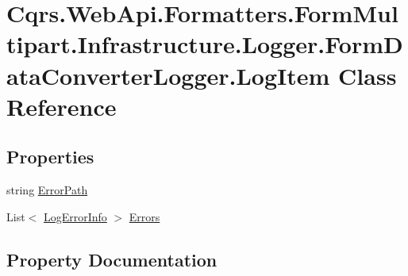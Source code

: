 \hypertarget{classCqrs_1_1WebApi_1_1Formatters_1_1FormMultipart_1_1Infrastructure_1_1Logger_1_1FormDataConverterLogger_1_1LogItem}{}\section{Cqrs.\+Web\+Api.\+Formatters.\+Form\+Multipart.\+Infrastructure.\+Logger.\+Form\+Data\+Converter\+Logger.\+Log\+Item Class Reference}
\label{classCqrs_1_1WebApi_1_1Formatters_1_1FormMultipart_1_1Infrastructure_1_1Logger_1_1FormDataConverterLogger_1_1LogItem}
\subsection*{Properties}
\begin{DoxyCompactItemize}
\item 
string \hyperlink{classCqrs_1_1WebApi_1_1Formatters_1_1FormMultipart_1_1Infrastructure_1_1Logger_1_1FormDataConverterLogger_1_1LogItem_a300199a6b543a7a53b81b18aeb10652b_a300199a6b543a7a53b81b18aeb10652b}{Error\+Path}
\item 
List$<$ \hyperlink{classCqrs_1_1WebApi_1_1Formatters_1_1FormMultipart_1_1Infrastructure_1_1Logger_1_1FormDataConverterLogger_1_1LogErrorInfo}{Log\+Error\+Info} $>$ \hyperlink{classCqrs_1_1WebApi_1_1Formatters_1_1FormMultipart_1_1Infrastructure_1_1Logger_1_1FormDataConverterLogger_1_1LogItem_ae02eb8b73e2614a9f24eb87bfaa6c23f_ae02eb8b73e2614a9f24eb87bfaa6c23f}{Errors}
\end{DoxyCompactItemize}


\subsection{Property Documentation}
\mbox{\label{classCqrs_1_1WebApi_1_1Formatters_1_1FormMultipart_1_1Infrastructure_1_1Logger_1_1FormDataConverterLogger_1_1LogItem_a300199a6b543a7a53b81b18aeb10652b_a300199a6b543a7a53b81b18aeb10652b}} 
